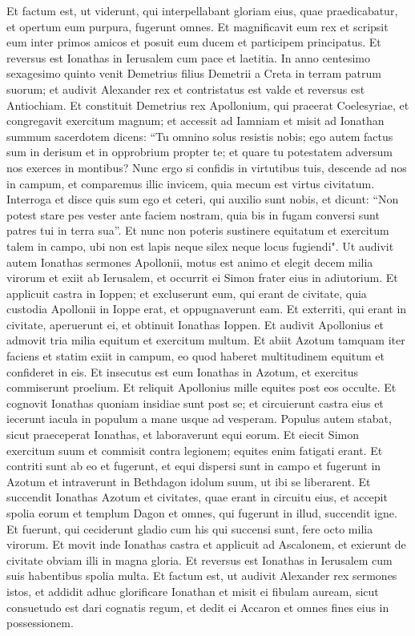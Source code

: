\begin{biblechapter}
\verse Et factum est, ut viderunt, qui interpellabant gloriam eius, quae praedicabatur, et opertum eum purpura, fugerunt omnes. 
\verse Et magnificavit eum rex et scripsit eum inter primos amicos et posuit eum ducem et participem principatus. 
\verse Et reversus est Ionathas in Ierusalem cum pace et laetitia. 
\verse In anno centesimo sexagesimo quinto venit Demetrius filius Demetrii a Creta in terram patrum suorum; 
\verse et audivit Alexander rex et contristatus est valde et reversus est Antiochiam. 
\verse Et constituit Demetrius rex Apollonium, qui praeerat Coelesyriae, et congregavit exercitum magnum; et accessit ad Iamniam et misit ad Ionathan summum sacerdotem 
\verse dicens: “Tu omnino solus resistis nobis; ego autem factus sum in derisum et in opprobrium propter te; et quare tu potestatem adversum nos exerces in montibus? 
\verse Nunc ergo si confidis in virtutibus tuis, descende ad nos in campum, et comparemus illic invicem, quia mecum est virtus civitatum. 
\verse Interroga et disce quis sum ego et ceteri, qui auxilio sunt nobis, et dicunt: “Non potest stare pes vester ante faciem nostram, quia bis in fugam conversi sunt patres tui in terra sua”. 
\verse Et nunc non poteris sustinere equitatum et exercitum talem in campo, ubi non est lapis neque silex neque locus fugiendi". 
\verse Ut audivit autem Ionathas sermones Apollonii, motus est animo et elegit decem milia virorum et exiit ab Ierusalem, et occurrit ei Simon frater eius in adiutorium. 
\verse Et applicuit castra in Ioppen; et excluserunt eum, qui erant de civitate, quia custodia Apollonii in Ioppe erat, et oppugnaverunt eam. 
\verse Et exterriti, qui erant in civitate, aperuerunt ei, et obtinuit Ionathas Ioppen.  
\verse Et audivit Apollonius et admovit tria milia equitum et exercitum multum. Et abiit Azotum tamquam iter faciens et statim exiit in campum, eo quod haberet multitudinem equitum et confideret in eis. 
\verse Et insecutus est eum Ionathas in Azotum, et exercitus commiserunt proelium. 
\verse Et reliquit Apollonius mille equites post eos occulte. 
\verse Et cognovit Ionathas quoniam insidiae sunt post se; et circuierunt castra eius et iecerunt iacula in populum a mane usque ad vesperam. 
\verse Populus autem stabat, sicut praeceperat Ionathas, et laboraverunt equi eorum. 
\verse Et eiecit Simon exercitum suum et commisit contra legionem; equites enim fatigati erant. Et contriti sunt ab eo et fugerunt, 
\verse et equi dispersi sunt in campo et fugerunt in Azotum et intraverunt in Bethdagon idolum suum, ut ibi se liberarent. 
\verse Et succendit Ionathas Azotum et civitates, quae erant in circuitu eius, et accepit spolia eorum et templum Dagon et omnes, qui fugerunt in illud, succendit igne. 
\verse Et fuerunt, qui ceciderunt gladio cum his qui succensi sunt, fere octo milia virorum. 
\verse Et movit inde Ionathas castra et applicuit ad Ascalonem, et exierunt de civitate obviam illi in magna gloria. 
\verse Et reversus est Ionathas in Ierusalem cum suis habentibus spolia multa. 
\verse Et factum est, ut audivit Alexander rex sermones istos, et addidit adhuc glorificare Ionathan  
\verse et misit ei fibulam auream, sicut consuetudo est dari cognatis regum, et dedit ei Accaron et omnes fines eius in possessionem. 
\end{biblechapter}

